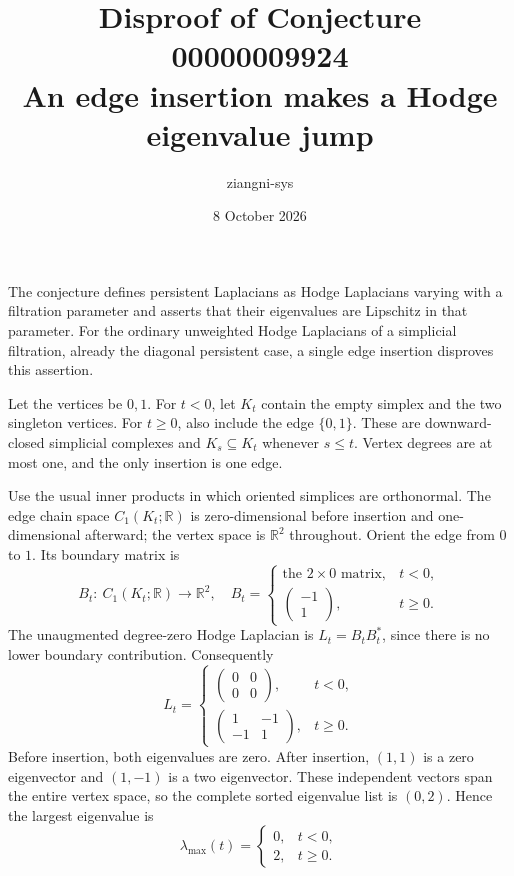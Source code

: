 \documentclass[11pt]{article}
\title{Disproof of Conjecture 00000009924\\An edge insertion makes a Hodge eigenvalue jump}
\author{ziangni-sys}
\date{8 October 2026}
\begin{document}
\maketitle
The conjecture defines persistent Laplacians as Hodge Laplacians varying with a filtration parameter and asserts that their eigenvalues are Lipschitz in that parameter. For the ordinary unweighted Hodge Laplacians of a simplicial filtration, already the diagonal persistent case, a single edge insertion disproves this assertion.

Let the vertices be $0,1$. For $t<0$, let $K_t$ contain the empty simplex and the two singleton vertices. For $t\ge0$, also include the edge $\{0,1\}$. These are downward-closed simplicial complexes and $K_s\subseteq K_t$ whenever $s\le t$. Vertex degrees are at most one, and the only insertion is one edge.

Use the usual inner products in which oriented simplices are orthonormal. The edge chain space $C_1(K_t;\mathbb R)$ is zero-dimensional before insertion and one-dimensional afterward; the vertex space is $\mathbb R^2$ throughout. Orient the edge from $0$ to $1$. Its boundary matrix is
\[
 B_t:\ C_1(K_t;\mathbb R)\longrightarrow\mathbb R^2,
 \quad B_t=\begin{cases}\text{the $2\times0$ matrix},&t<0,\\[-1mm]
 \begin{pmatrix}-1\\1\end{pmatrix},&t\ge0.
 \end{cases}
\]
The unaugmented degree-zero Hodge Laplacian is $L_t=B_tB_t^*$, since there is no lower boundary contribution. Consequently
\[
 L_t=\begin{cases}
 \begin{pmatrix}0&0\\0&0\end{pmatrix},&t<0,\\[2mm]
 \begin{pmatrix}1&-1\\-1&1\end{pmatrix},&t\ge0.
 \end{cases}
\]
Before insertion, both eigenvalues are zero. After insertion, $(1,1)$ is a zero eigenvector and $(1,-1)$ is a two eigenvector. These independent vectors span the entire vertex space, so the complete sorted eigenvalue list is $(0,2)$. Hence the largest eigenvalue is
\[
 \lambda_{\max}(t)=\begin{cases}0,&t<0,\\2,&t\ge0.\end{cases}
\]
\end{document}
